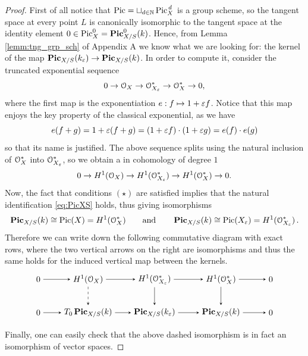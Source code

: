 	\begin{proof}
		First of all notice that $\operatorname{Pic} = \sqcup_{d\in \mathbb{N}}\operatorname{Pic}^{\,d}_X$ is a group scheme, so the tangent space at every point $L$ is canonically isomorphic to the tangent space at the identity element $ 0\in \operatorname{Pic}^0_X = \operatorname{\mathbf{Pic}}_{X/S}^0(k)$.
		Hence, from Lemma \ref{lemm:tng_grp_sch} of Appendix A we know what we are looking for: the kernel of the map $ \operatorname{\mathbf{Pic}}_{X/S}(k_\varepsilon)\to  \operatorname{\mathbf{Pic}}_{X/S}(k)$. In order to compute it, consider the truncated exponential sequence
		$$ 0 \to \mathcal{O}_X \to \mathcal{O}_{X_\varepsilon}^* \to \mathcal{O}_X^* \to 0, $$
		where the first map is the exponentiation $e: f\mapsto 1+\varepsilon f$. Notice that this map enjoys the key property of the classical exponential, as we have 
		$$ e(f + g) = 1+\varepsilon(f+g) = (1+\varepsilon f)\cdot(1+\varepsilon g) = e(f) \cdot e(g) $$
		so that its name is justified. The above sequence splits using the natural inclusion of $\mathcal{O}_X^*$ into $\mathcal{O}_{X_\varepsilon}^*$, so we obtain a \ses in cohomology of degree $1$
		$$ 0 \to H^1(\mathcal{O}_X) \to H^1(\mathcal{O}_{X_\varepsilon}^*) \to H^1(\mathcal{O}_X^*) \to 0. $$
		Now, the fact that conditions $(\star)$ are satisfied implies that the natural identification \eqref{eq:PicXS} holds, thus giving isomorphisms
		$$ \operatorname{\mathbf{Pic}}_{X/S}(k) \cong \operatorname{Pic}(X) = H^1(\mathcal{O}_X^*) \qquad \text{and} \qquad \operatorname{\mathbf{Pic}}_{X/S}(k) \cong \operatorname{Pic}(X_\varepsilon) = H^1(\mathcal{O}_{X_\varepsilon}^*)\,. $$
		Therefore we can write down the following commutative diagram with exact rows, where the two vertical arrows on the right are isomorphisms and thus the same holds for the induced vertical map between the kernels.
		$$
		\begin{tikzpicture}[node distance=4em, auto]
			\node (O) 															{$0$};
			\node (A) 	[right of=O, xshift=2em]		{$H^1(\OX)$};
			\node (A2) 	[right of=A]								{$\;$};
			\node (B) 	[right of=A2]								{$H^1(\calO_{X_\eps}^*)$};
			\node (B2) 	[right of=B]								{$\;$};
		  \node (C) 	[right of=B2] 							{$H^1(\OX^*)$};
		  \node (OO) 	[right of=C, xshift=2em] 		{$0$};
		  \node (O') 	[below of=O] 								{$0$};
		  \node (A') 	[below of=A] 								{$T_0 \PicXS(k)$};
		  \node (B') 	[below of=B] 								{$ \PicXS(k_\eps)$};
		  \node (C') 	[below of=C] 								{$ \PicXS(k)$};
		  \node (OO') [below of=OO] 							{$0$};
		  \draw[-stealth] 				(O)	to node {} (A);
		  \draw[-stealth]					(A)		to node {} (B);
		  \draw[-stealth]					(B)		to node {} (C);
		  \draw[-stealth]					(C)		to node {} (OO);
		  \draw[-stealth]					(O')	to node {} (A');
		  \draw[-stealth]					(A')	to node {} (B');
		  \draw[-stealth]					(B')	to node {} (C');
		  \draw[-stealth]					(C')	to node {} (OO');
		  \draw[-stealth][dashed]	(A)	to node {} (A');
		  \draw[-stealth]					(B)		to node {} (B');
		  \draw[-stealth]					(C)		to node {} (C');
		\end{tikzpicture}
		$$
		Finally, one can easily check that the above dashed isomorphism is in fact an isomorphism of vector spaces.
	\end{proof}

